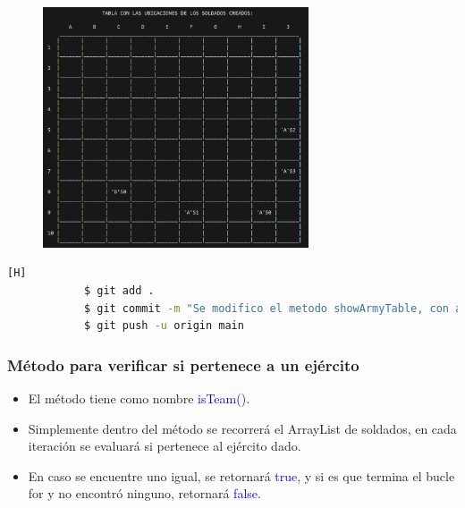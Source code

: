 \documentclass{article}
\begin{document}
        \begin{figure}[H]
            \centering
            \includegraphics[width=0.7\textwidth,keepaspectratio]{img/showArmyTable.png}
            \caption{}
        \end{figure}

        \begin{lstlisting}[language=bash,caption={Commit: Se adaptó e implementó el método para mostrar la tabla con los soldados de ambos ejércitos}][H]
    		$ git add .
    		$ git commit -m "Se modifico el metodo showArmyTable, con ayuda de un metodo que sirve al momento de graficar, este verifica a que team pertenece y segun eso sera mostrado en la tabla"
    		$ git push -u origin main
    	\end{lstlisting}
        
        
        \subsubsection{Método para verificar si pertenece a un ejército}

        \begin{itemize}
            \item El método tiene como nombre \textcolor{blue}{isTeam()}.
            \item Simplemente dentro del método se recorrerá el ArrayList de soldados, en cada iteración se evaluará si pertenece al ejército dado.
            \item En caso se encuentre uno igual, se retornará \textcolor{blue}{true}, y si es que termina el bucle for y no encontró ninguno, retornará \textcolor{blue}{false}.
        \end{itemize}
\end{document}
